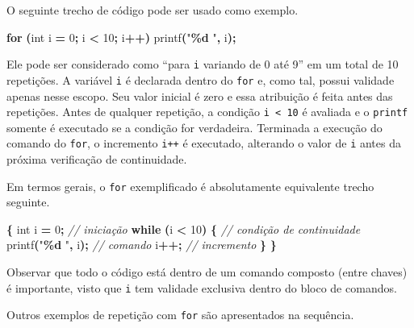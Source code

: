 \documentclass[
  11pt,
  a4paper,
]{scrbook}
\newenvironment{Shaded}{\begin{snugshade}}{\end{snugshade}}
\newcommand{\CommentTok}[1]{\textcolor[rgb]{0.56,0.35,0.01}{\textit{#1}}}
\newcommand{\ControlFlowTok}[1]{\textcolor[rgb]{0.13,0.29,0.53}{\textbf{#1}}}
\newcommand{\DataTypeTok}[1]{\textcolor[rgb]{0.13,0.29,0.53}{#1}}
\newcommand{\DecValTok}[1]{\textcolor[rgb]{0.00,0.00,0.81}{#1}}
\newcommand{\NormalTok}[1]{#1}
\newcommand{\OperatorTok}[1]{\textcolor[rgb]{0.81,0.36,0.00}{\textbf{#1}}}
\newcommand{\SpecialCharTok}[1]{\textcolor[rgb]{0.81,0.36,0.00}{\textbf{#1}}}
\newcommand{\StringTok}[1]{\textcolor[rgb]{0.31,0.60,0.02}{#1}}
\begin{document}
O seguinte trecho de código pode ser usado como exemplo.

\begin{Shaded}
\begin{Highlighting}[]
\ControlFlowTok{for} \OperatorTok{(}\DataTypeTok{int}\NormalTok{ i }\OperatorTok{=} \DecValTok{0}\OperatorTok{;}\NormalTok{ i }\OperatorTok{\textless{}} \DecValTok{10}\OperatorTok{;}\NormalTok{ i}\OperatorTok{++)}
\NormalTok{    printf}\OperatorTok{(}\StringTok{"}\SpecialCharTok{\%d}\StringTok{ "}\OperatorTok{,}\NormalTok{ i}\OperatorTok{);}
\end{Highlighting}
\end{Shaded}

Ele pode ser considerado como ``para \texttt{i} variando de 0 até 9'' em
um total de 10 repetições. A variável \texttt{i} é declarada dentro do
\texttt{for} e, como tal, possui validade apenas nesse escopo. Seu valor
inicial é zero e essa atribuição é feita antes das repetições. Antes de
qualquer repetição, a condição \texttt{i\ \textless{}\ 10} é avaliada e
o \texttt{printf} somente é executado se a condição for verdadeira.
Terminada a execução do comando do \texttt{for}, o incremento
\texttt{i++} é executado, alterando o valor de \texttt{i} antes da
próxima verificação de continuidade.

Em termos gerais, o \texttt{for} exemplificado é absolutamente
equivalente trecho seguinte.

\begin{Shaded}
\begin{Highlighting}[]
\OperatorTok{\{}
    \DataTypeTok{int}\NormalTok{ i }\OperatorTok{=} \DecValTok{0}\OperatorTok{;}  \CommentTok{// iniciação}
    \ControlFlowTok{while} \OperatorTok{(}\NormalTok{i }\OperatorTok{\textless{}} \DecValTok{10}\OperatorTok{)} \OperatorTok{\{}  \CommentTok{// condição de continuidade}
\NormalTok{        printf}\OperatorTok{(}\StringTok{"}\SpecialCharTok{\%d}\StringTok{ "}\OperatorTok{,}\NormalTok{ i}\OperatorTok{);}  \CommentTok{// comando}
\NormalTok{        i}\OperatorTok{++;}  \CommentTok{// incremento}
    \OperatorTok{\}}
\OperatorTok{\}}
\end{Highlighting}
\end{Shaded}

Observar que todo o código está dentro de um comando composto (entre
chaves) é importante, visto que \texttt{i} tem validade exclusiva dentro
do bloco de comandos.

Outros exemplos de repetição com \texttt{for} são apresentados na
sequência.
\end{document}
